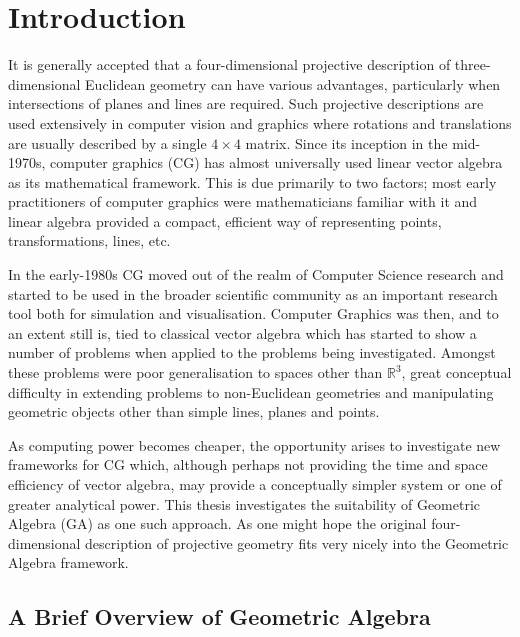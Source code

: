 \begin{savequote}
\end{savequote}

\chapter{Introduction}
\label{chap:introduction}

It is generally accepted that a four-dimensional projective description of
three-dimensional Euclidean geometry can have various advantages, particularly
when intersections of planes and lines are required. Such projective
descriptions are used extensively in computer vision and graphics where
rotations and translations are usually described by a single $4\times 4$
matrix. Since its inception in the mid-1970s, computer graphics (CG) has
almost universally used linear vector algebra as its mathematical framework.
This is due primarily to two factors; most early practitioners of computer
graphics were mathematicians familiar with it and linear algebra provided a
compact, efficient way of representing points, transformations, lines, etc.

In the early-1980s CG moved out of the realm of Computer Science research and
started to be used in the broader scientific community as an important
research tool both for simulation and visualisation.  Computer Graphics was
then, and to an extent still is, tied to classical vector algebra which has
started to show a number of problems when applied to the problems being
investigated. Amongst these problems were poor generalisation to spaces other
than $\mathbb{R}^3$, great conceptual difficulty in extending problems to
non-Euclidean geometries and manipulating geometric objects other than simple
lines, planes and points.

As computing power becomes cheaper, the opportunity arises to investigate new
frameworks for CG which, although perhaps not providing the time and space
efficiency of vector algebra, may provide a conceptually simpler system or one
of greater analytical power. This thesis investigates the suitability of
Geometric Algebra (GA) as one such approach. As one might hope the original
four-dimensional description of projective geometry fits very nicely into the
Geometric Algebra framework\cite{HZ91,IJPR00}. 

\section{A Brief Overview of Geometric Algebra}

